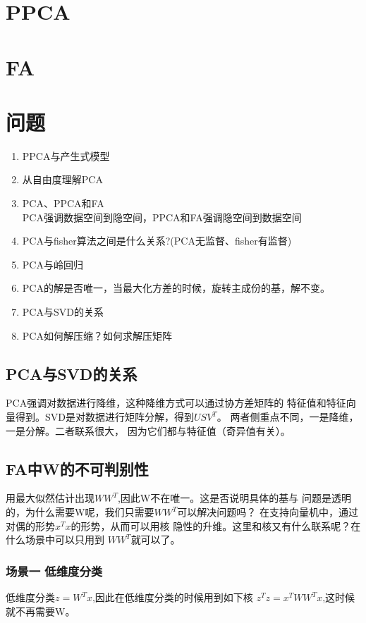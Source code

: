 \section{PPCA}
\section{FA}

\section{问题}
\begin{enumerate}
\item PPCA与产生式模型
\item 从自由度理解PCA
\item PCA、PPCA和FA\\
PCA强调数据空间到隐空间，PPCA和FA强调隐空间到数据空间
\item PCA与fisher算法之间是什么关系?(PCA无监督、fisher有监督)
\item PCA与岭回归 \cite{murphy2012machine}
\item PCA的解是否唯一，当最大化方差的时候，旋转主成份的基，解不变。
\item PCA与SVD的关系
\item PCA如何解压缩？如何求解压矩阵
\end{enumerate}
\subsection{PCA与SVD的关系}
PCA强调对数据进行降维，这种降维方式可以通过协方差矩阵的
特征值和特征向量得到。SVD是对数据进行矩阵分解，得到$USV^T$。
两者侧重点不同，一是降维，一是分解。二者联系很大，
因为它们都与特征值（奇异值有关）。
\subsection{FA中W的不可判别性}
用最大似然估计出现$WW^T$,因此W不在唯一。这是否说明具体的基与
问题是透明的，为什么需要W呢，我们只需要$WW^T$可以解决问题吗？
在支持向量机中，通过对偶的形势$x^Tx$的形势，从而可以用核
隐性的升维。这里和核又有什么联系呢？在什么场景中可以只用到
$WW^T$就可以了。

\subsubsection{场景一 低维度分类}
低维度分类$z = W^Tx$,因此在低维度分类的时候用到如下核
$z^Tz = x^TWW^Tx$,这时候就不再需要W。 



